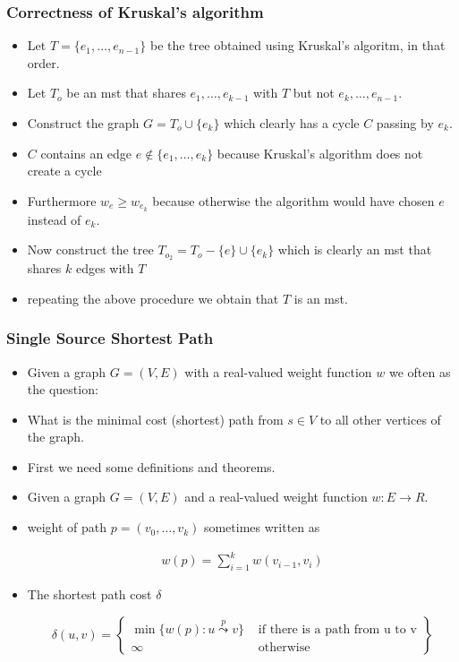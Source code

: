 \documentclass{beamer}
\begin{document}
\begin{frame}
  \frametitle{Correctness of Kruskal's algorithm}
  \begin{itemize}
   \item Let $T=\{e_1,\ldots,e_{n-1}\}$ be the tree obtained using Kruskal's algoritm, in that order.
   \item Let $T_o$ be an mst that shares $e_1,\ldots,e_{k-1}$ with $T$ but not $e_k,\ldots,e_{n-1}$.
   \item Construct the graph $G=T_o\cup \{e_k\}$ which clearly has a cycle $C$ passing by $e_k$. 
   \item $C$ contains an edge $e\notin\{e_1,\ldots,e_k\}$ because Kruskal's algorithm does not create a cycle
   \item Furthermore $w_e\ge w_{e_k}$ because otherwise the algorithm would have chosen $e$ instead of $e_k$.
   \item Now construct the tree $T_{o_2}=T_o-\{e\}\cup\{e_k\}$ which is clearly an mst that shares $k$ edges with $T$
   \item repeating the above procedure we obtain that $T$ is an mst.
  \end{itemize}
\end{frame}
\begin{frame}
  \frametitle{Single Source Shortest Path}
  \begin{itemize}
  \item Given a graph $G=(V,E)$ with a real-valued weight function $w$
    we often as the question:
  \item What is the minimal cost (shortest)  path from $s\in V$
    to all other vertices of the graph.
  
\item First we need some definitions and theorems.
  \end{itemize}
\end{frame}

\begin{frame}
  \begin{itemize}
  \item Given a graph $G=(V,E)$ and a real-valued weight function
    $w:E\rightarrow R$.
  \item weight of path $p=(v_0,\ldots,v_k)$ sometimes written as

    \begin{align*}
      w(p)=\sum_{i=1}^kw(v_{i-1},v_i)
    \end{align*}
\item The shortest path cost $\delta$

  \begin{displaymath}
    \delta(u,v)=\begin{Bmatrix}
    \min \{w(p):u\stackrel{p}{\leadsto}v\}& \text{ if there is a path
      from u to v}\\
    \infty & \text{ otherwise }   
  \end{Bmatrix}
  \end{displaymath}
  \end{itemize}
\end{frame}
\end{document}
